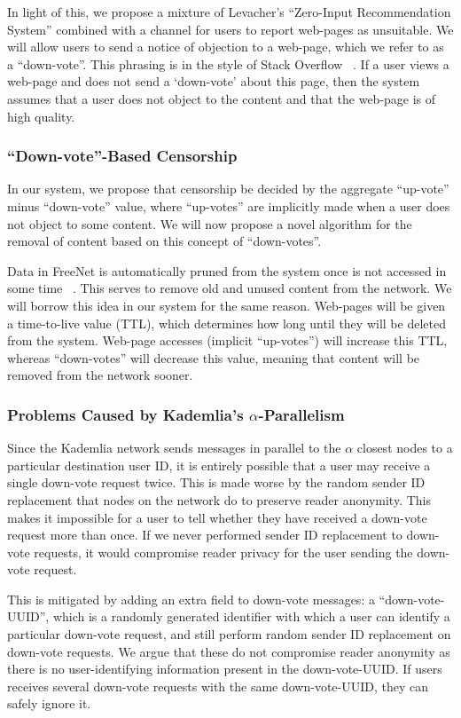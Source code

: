 In light of this, we propose a mixture of Levacher's ``Zero-Input Recommendation System'' combined with a channel for users to
report web-pages as unsuitable.
We will allow users to send a notice of objection to a web-page, which we refer to as a ``down-vote''. This phrasing is in the
style of Stack Overflow ~\cite{stackoverflow}. If a user views a web-page and does not send a `down-vote' about this page, then the
system assumes that a user does not object to the content and that the web-page is of high quality.

\subsubsection{``Down-vote''-Based Censorship}

In our system, we propose that censorship be decided by the aggregate ``up-vote'' minus ``down-vote'' value,
where ``up-votes'' are implicitly made when a user does not object to some content.
We will now propose a novel algorithm for the removal of content based on this concept of ``down-votes''.

Data in FreeNet is automatically pruned from the system once is not accessed in some time ~\cite{freenet}.
This serves to remove old and unused content from the network. We will borrow this idea in our system for
the same reason. Web-pages will be given a time-to-live value (TTL), which determines how long until they will
be deleted from the system. Web-page accesses (implicit ``up-votes'') will increase this
TTL, whereas ``down-votes'' will decrease this value, meaning that content will be removed from the network sooner.

\subsubsection{Problems Caused by Kademlia's $\alpha$-Parallelism}

Since the Kademlia network sends messages in parallel to the $\alpha$ closest nodes to a particular destination user ID,
it is entirely possible that a user may receive a single down-vote request twice. This is made worse by the
random sender ID replacement that nodes on the network do to preserve reader anonymity.
This makes it impossible for a user to tell whether they have received a down-vote request more than once.
If we never performed sender ID replacement to down-vote requests, it would compromise reader privacy for the user
sending the down-vote request.

This is mitigated by adding an extra field to down-vote messages: a ``down-vote-UUID'', which is a randomly generated
identifier with which a user can identify a particular down-vote request, and still perform random sender ID
replacement on down-vote requests. We argue that these do not compromise reader anonymity as there is no
user-identifying information present in the down-vote-UUID. If users receives several down-vote requests
with the same down-vote-UUID, they can safely ignore it.

